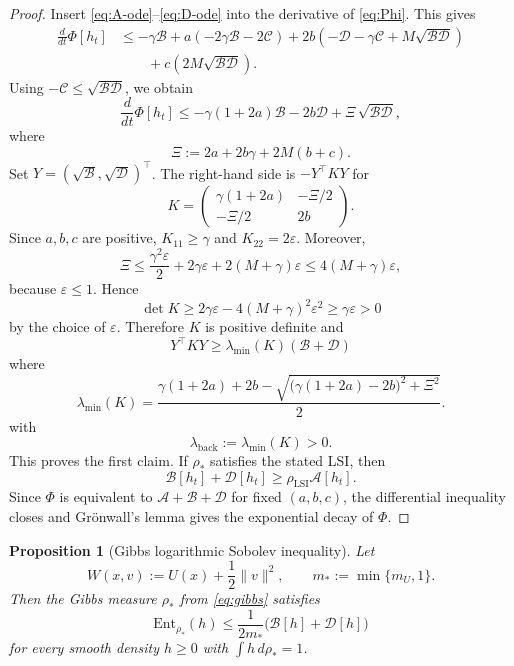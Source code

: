 \documentclass[11pt]{article}
\newtheorem{proposition}[theorem]{Proposition}
\theoremstyle{definition}
\theoremstyle{remark}
\newcommand{\Ent}{\mathrm{Ent}}
\begin{document}
\begin{proof}
Insert \eqref{eq:A-ode}--\eqref{eq:D-ode} into the derivative of
\eqref{eq:Phi}. This gives
\begin{align*}
\frac{d}{dt}\Phi[h_t]
&\leq
-\gamma\mathcal B
+a(-2\gamma \mathcal B-2\mathcal C)
+2b(-\mathcal D-\gamma\mathcal C+M\sqrt{\mathcal B\mathcal D})\\
&\qquad
+c(2M\sqrt{\mathcal B\mathcal D}).
\end{align*}
Using $-\mathcal C\leq \sqrt{\mathcal B\mathcal D}$, we obtain
\[
\frac{d}{dt}\Phi[h_t]
\leq
-\gamma(1+2a)\mathcal B
-2b\mathcal D
+\Xi\,\sqrt{\mathcal B\mathcal D},
\]
where
\[
\Xi:=2a+2b\gamma+2M(b+c).
\]
Set $Y=(\sqrt{\mathcal B},\sqrt{\mathcal D})^\top$. The right-hand side is
$-Y^\top K Y$ for
\[
K=
\begin{pmatrix}
\gamma(1+2a) & -\Xi/2\\[0.3em]
-\Xi/2 & 2b
\end{pmatrix}.
\]
Since $a,b,c$ are positive, $K_{11}\geq \gamma$ and $K_{22}=2\varepsilon$.
Moreover,
\[
\Xi
\leq
\frac{\gamma^2\varepsilon}{2}+2\gamma\varepsilon+2(M+\gamma)\varepsilon
\leq 4(M+\gamma)\varepsilon,
\]
because $\varepsilon\leq1$. Hence
\[
\det K
\geq
2\gamma\varepsilon-4(M+\gamma)^2\varepsilon^2
\geq
\gamma\varepsilon>0
\]
by the choice of $\varepsilon$. Therefore $K$ is positive definite and
\[
Y^\top K Y\geq \lambda_{\min}(K)(\mathcal B+\mathcal D)
\]
where
\[
\lambda_{\min}(K)
=\frac{\gamma(1+2a)+2b-\sqrt{\bigl(\gamma(1+2a)-2b\bigr)^2+\Xi^2}}{2}.
\]
with
\[
\lambda_{\mathrm{back}}:=\lambda_{\min}(K)>0.
\]
This proves the first claim. If $\rho_*$ satisfies the stated LSI, then
\[
\mathcal B[h_t]+\mathcal D[h_t]\geq \rho_{\mathrm{LSI}}\mathcal A[h_t].
\]
Since $\Phi$ is equivalent to $\mathcal A+\mathcal B+\mathcal D$ for fixed
$(a,b,c)$, the differential inequality closes and Gr\"onwall's lemma gives the
exponential decay of $\Phi$.
\end{proof}

\begin{proposition}[Gibbs logarithmic Sobolev inequality]\label{prop:gibbs-lsi}
Let
\[
W(x,v):=U(x)+\frac12\|v\|^2,
\qquad
m_*:=\min\{m_U,1\}.
\]
Then the Gibbs measure $\rho_*$ from \eqref{eq:gibbs} satisfies
\begin{equation}\label{eq:gibbs-lsi}
\Ent_{\rho_*}(h)
\leq
\frac{1}{2m_*}\bigl(\mathcal B[h]+\mathcal D[h]\bigr)
\end{equation}
for every smooth density $h\geq0$ with $\int h\,d\rho_*=1$.
\end{proposition}
\end{document}
